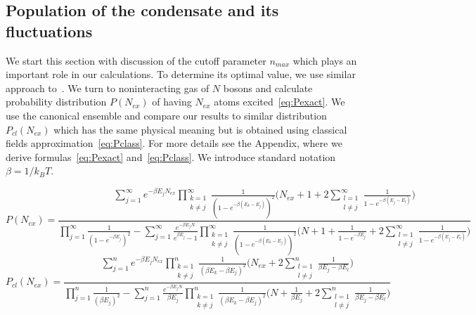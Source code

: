 \documentclass[aps,pra,reprint]{revtex4-2}
\begin{document}
\subsection{Population of the condensate and its fluctuations}
We start this section with discussion of the cutoff parameter $n_{max}$ which 
plays an important role in our calculations. To determine its optimal value, 
we use similar approach to~\cite{Witkowska2009,Witkowska2010}. We turn to 
noninteracting gas of $N$ bosons and calculate probability distribution 
$P(N_{ex})$  of having $N_{ex}$ atoms excited~\eqref{eq:Pexact}. We use the 
canonical ensemble and compare our results to similar distribution 
$P_{cl}(N_{ex})$ which has the same physical meaning but is obtained using 
classical fields approximation~\eqref{eq:Pclass}. For more details see the 
Appendix, where we derive formulas~\eqref{eq:Pexact} and~\eqref{eq:Pclass}. We 
introduce standard notation $\beta=1/k_{\textit{B}} T$.
\begin{widetext}
\begin{equation}
\label{eq:Pexact}
P(N_{ex}) = \frac{\sum_{j=1}^{\infty} e^{-\beta E_j N_{ex}} 
\prod_{\substack{k=1 \\ k \neq j}}^{\infty} \frac{1}{(1-e^{-\beta(E_k-E_j)})^2} 
\bigg(N_{ex} + 1 + 2\sum_{\substack{l=1 \\ l \neq j}}^{\infty} 
\frac{1}{1-e^{-\beta(E_j-E_l)}} \bigg)}
{\prod _{j=1}^{\infty} \frac{1}{(1-e^{-\beta E_j})^2} - 
\sum_{j=1}^{\infty}\frac{e^{-\beta E_j N}}{e^{ \beta E_j}-1} 
\prod_{\substack{k=1 \\ k \neq j}}^{\infty} \frac{1}{(1-e^{-\beta(E_k-E_j)})^2} 
\bigg(N + 1 + \frac{1}{1-e^{-\beta E_j}} + 
2\sum_{\substack{l=1 \\ l \neq j}}^{\infty} 
\frac{1}{1-e^{-\beta(E_j-E_l)}} \bigg)}
\end{equation}
\begin{equation}
\label{eq:Pclass}
P_{cl}(N_{ex}) = \frac{\sum_{j=1}^n e^{-\beta E_j N_{ex}} 
\prod_{\substack{k=1 \\ k \neq j}}^n \frac{1}{(\beta E_k-\beta E_j)^2} 
\bigg(N_{ex} + 2\sum_{\substack{l=1 \\ l \neq j}}^n 
\frac{1}{\beta E_j-\beta E_l}\bigg)}
{\prod_{j=1}^n \frac{1}{(\beta E_j)^2} - 
\sum_{j=1}^n \frac{e^{-\beta E_j N}}{\beta E_j} 
\prod_{\substack{k=1 \\ k \neq j}}^n \frac{1}{(\beta E_k-\beta E_j)^2}
\bigg(N + \frac{1}{\beta E_j} + 2\sum_{\substack{l=1 \\ l \neq j}}^n 
\frac{1}{\beta E_j-\beta E_l}\bigg)}
\end{equation}
\end{widetext}
\end{document}
